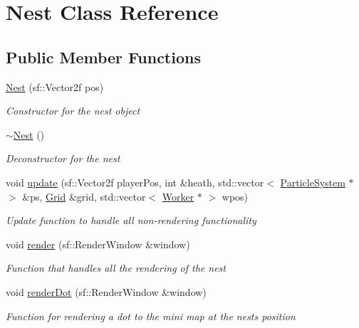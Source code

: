 \hypertarget{class_nest}{}\section{Nest Class Reference}
\label{class_nest}
\subsection*{Public Member Functions}
\begin{DoxyCompactItemize}
\item 
\mbox{\hyperlink{class_nest_af171ff62bfa8ef5d2ea793ef73be1625}{Nest}} (sf\+::\+Vector2f pos)
\begin{DoxyCompactList}\small\item\em Constructor for the nest object \end{DoxyCompactList}\item 
\mbox{\hyperlink{class_nest_a3e879ba15acd31717b1dc9bdc87488d5}{$\sim$\+Nest}} ()
\begin{DoxyCompactList}\small\item\em Deconstructor for the nest \end{DoxyCompactList}\item 
void \mbox{\hyperlink{class_nest_ac9896d1f535b58bf155b0366164fe08f}{update}} (sf\+::\+Vector2f player\+Pos, int \&heath, std\+::vector$<$ \mbox{\hyperlink{class_particle_system}{Particle\+System}} $\ast$ $>$ \&ps, \mbox{\hyperlink{class_grid}{Grid}} \&grid, std\+::vector$<$ \mbox{\hyperlink{class_worker}{Worker}} $\ast$ $>$ wpos)
\begin{DoxyCompactList}\small\item\em Update function to handle all non-\/rendering functionality \end{DoxyCompactList}\item 
void \mbox{\hyperlink{class_nest_a09d907a3d411da0249c7d0bb5ad7b36c}{render}} (sf\+::\+Render\+Window \&window)
\begin{DoxyCompactList}\small\item\em Function that handles all the rendering of the nest \end{DoxyCompactList}\item 
void \mbox{\hyperlink{class_nest_abb94bc33eb34d32c3ddb209a777728ab}{render\+Dot}} (sf\+::\+Render\+Window \&window)
\begin{DoxyCompactList}\small\item\em Function for rendering a dot to the mini map at the nests position \end{DoxyCompactList}\item 

\end{DoxyCompactItemize}
